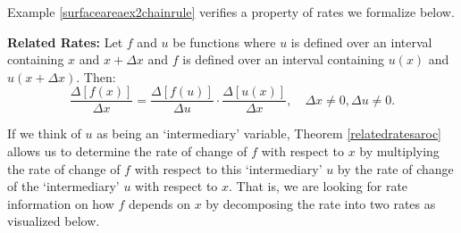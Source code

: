 \documentclass{ximera}
\begin{document}
Example \ref{surfaceareaex2chainrule} verifies a property of rates we formalize below.

\medskip


\begin{theorem}\label{relatedratesaroc} \textbf{Related Rates:} 
Let $f$ and $u$ be functions where $u$ is defined over an interval containing $x$ and $x+\Delta x$ and $f$ is defined over an interval containing $u(x)$ and $u(x + \Delta x)$.  Then:
\[ \dfrac{ \Delta[f(x)]}{\Delta x} =  \dfrac{ \Delta[f(u)]}{\Delta u}  \cdot  \dfrac{ \Delta[u(x)]}{\Delta x}, \quad \Delta x \neq 0,  \Delta u  \neq 0. \]

\end{theorem}

\medskip

If we think of $u$ as being an `intermediary' variable, Theorem \ref{relatedratesaroc} allows us to determine the rate of change of $f$ with respect to $x$ by multiplying the rate of change of $f$ with respect to this `intermediary' $u$ by the rate of change of the `intermediary' $u$ with respect to $x$.   That is, we are looking for rate  information on how $f$ depends on $x$ by decomposing the rate into two rates as visualized below.

\begin{center}

\footnotesize

% 


\end{center}
\end{document}
